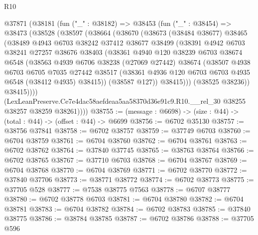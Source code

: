 \begin{lexlean}{R10}
\begin{coremodule}
  @37871
    (@38181
      (fun ("_" : @38182) =>
      @38453
        (fun ("_" : @38454) =>
        @38473
          (@38528
            (@38597
              (@38664
                (@38670
                  (@38673
                    (@38484 @38677)
                    @38465
                    (@38489
                      @4943
                      @6703
                      @38242
                      @37412
                      @38677
                      @38499
                      (@38391
                        @4942
                        @6703
                        @38241
                        @27257
                        @38676
                        @38403
                        (@38361
                          @4940
                          @120
                          @38239
                          @6703
                          @38674
                          @6548
                          (@38563
                            @4939
                            @6706
                            @38238
                            (@27069 @27442)
                            @38674
                            (@38507
                              @4938
                              @6703
                              @6705
                              @7035
                              @27442
                              @38517
                              (@38361 @4936 @120 @6703 @6703 @4935 @6548 (@38412 @4935) @38415))
                            (@38587 @127))
                          @38415)))
                    (@38525 @38236))
                  @38415))))
          (LexLeanPreserve.Ce7e4dac58aefdeaa5aa58370d36e91c9.R10.__rel_30
            @38255
            @38257
            @38259
            @38261))))
@38755 := (message : @6698) -> (size : @44) -> (total : @44) -> (offset : @44) -> @6699
@38756 := @6702 @35130
@38757 := @38756 @37841
@38758 := @6702 @38757
@38759 := @37749 @6703
@38760 := @6704 @38759
@38761 := @6704 @38760
@38762 := @6704 @38761
@38763 := @6702 @38762
@38764 := @37840 @37745
@38765 := @38763 @38764
@38766 := @6702 @38765
@38767 := @37710 @6703
@38768 := @6704 @38767
@38769 := @6704 @38768
@38770 := @6704 @38769
@38771 := @6702 @38770
@38772 := @37840 @37706
@38773 := @38771 @38772
@38774 := @6702 @38773
@38775 := @37705 @528
@38777 := @7538 @38775 @7563
@38778 := @6707 @38777
@38780 := @6702 @38778 @6703
@38781 := @6704 @38780
@38782 := @6704 @38781
@38783 := @6704 @38782
@38784 := @6702 @38783
@38785 := @37840 @38775
@38786 := @38784 @38785
@38787 := @6702 @38786
@38788 := @37705 @596

\end{coremodule}
\end{lexlean}

